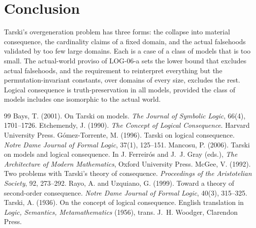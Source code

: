 \documentclass{situationist-preprint}
\begin{document}
\section{Conclusion}

Tarski's overgeneration problem has three forms: the collapse into material consequence, the cardinality claims of a fixed domain, and the actual falsehoods validated by too few large domains. Each is a case of a class of models that is too small. The actual-world proviso of LOG-06-a sets the lower bound that excludes actual falsehoods, and the requirement to reinterpret everything but the permutation-invariant constants, over domains of every size, excludes the rest. Logical consequence is truth-preservation in all models, provided the class of models includes one isomorphic to the actual world.

\begin{thebibliography}{99}\small
{} Bays, T. (2001). On Tarski on models. \emph{The Journal of Symbolic Logic}, 66(4), 1701--1726.
 Etchemendy, J. (1990). \emph{The Concept of Logical Consequence}. Harvard University Press.
 G\'omez-Torrente, M. (1996). Tarski on logical consequence. \emph{Notre Dame Journal of Formal Logic}, 37(1), 125--151.
 Mancosu, P. (2006). Tarski on models and logical consequence. In J. Ferreir\'os and J.~J. Gray (eds.), \emph{The Architecture of Modern Mathematics}, Oxford University Press.
 McGee, V. (1992). Two problems with Tarski's theory of consequence. \emph{Proceedings of the Aristotelian Society}, 92, 273--292.
 Rayo, A. and Uzquiano, G. (1999). Toward a theory of second-order consequence. \emph{Notre Dame Journal of Formal Logic}, 40(3), 315--325.
 Tarski, A. (1936). On the concept of logical consequence. English translation in \emph{Logic, Semantics, Metamathematics} (1956), trans. J.~H. Woodger, Clarendon Press.
\end{thebibliography}
\end{document}

